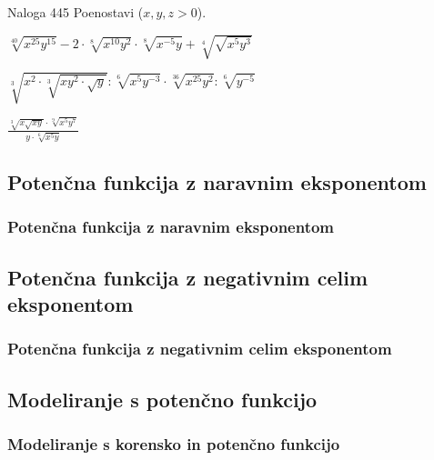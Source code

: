         \begin{frame}
            \begin{exampleblock}{Naloga 445}
                Poenostavi ($x,y,z>0$).
                \begin{description}
                    \item<2->[(g)] $\displaystyle \sqrt[40]{x^{25}y^{15}}-2\cdot\sqrt[8]{x^{10}y^2}\cdot\sqrt[8]{x^{-5}y}+\sqrt[4]{\sqrt{x^5y^3}}$
                    \item<3->[(m)] $\displaystyle \sqrt[3]{x^2\cdot\sqrt[3]{xy^2\cdot\sqrt{y}}}:\sqrt[6]{x^5y^{-3}}\cdot\sqrt[36]{x^{25}y^2}:\sqrt[6]{y^{-5}}$
                    \item<4->[(o)] $\displaystyle \frac{\sqrt[3]{x\sqrt{xy}}\cdot\sqrt[9]{x^5y^7}}{y\cdot\sqrt[6]{x^5y}}$  
                \end{description}
            \end{exampleblock}

        \end{frame}

    \subsection{Potenčna funkcija z naravnim eksponentom}

        \begin{frame}
            \frametitle{Potenčna funkcija z naravnim eksponentom}
        \end{frame}

    \subsection{Potenčna funkcija z negativnim celim eksponentom}

        \begin{frame}
            \frametitle{Potenčna funkcija z negativnim celim eksponentom}
        \end{frame}


    \subsection{Modeliranje s potenčno funkcijo}

        \begin{frame}
            \frametitle{Modeliranje s korensko in potenčno funkcijo}
        \end{frame}
